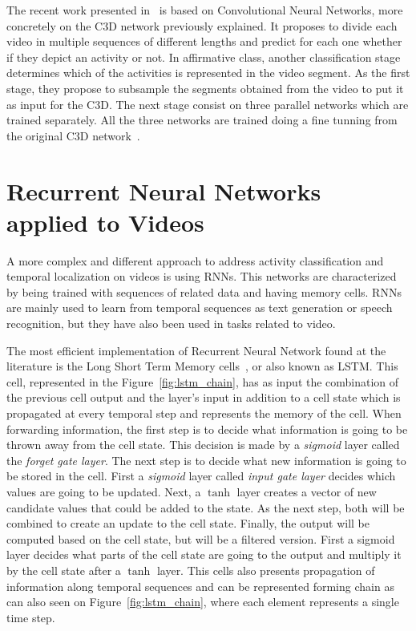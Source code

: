 The recent work presented in~\cite{shoutemporal} is based on Convolutional Neural Networks, more concretely on the C3D network previously explained. It proposes to divide each video in multiple sequences of different lengths and predict for each one whether if they depict an activity or not. In affirmative class, another classification stage determines which of the activities is represented in the video segment. As the first stage, they propose to subsample the segments obtained from the video to put it as input for the C3D. The next stage consist on three parallel networks which are trained separately. All the three networks are trained doing a fine tunning from the original C3D network~\cite{tran2014learning}.

\section{Recurrent Neural Networks applied to Videos}

A more complex and different approach to address activity classification and temporal localization on videos is using RNNs. This networks are characterized by being trained with sequences of related data and having memory cells. RNNs are mainly used to learn from temporal sequences as text generation or speech recognition, but they have also been used in tasks related to video.

The most efficient implementation of Recurrent Neural Network found at the literature is the Long Short Term Memory cells~\cite{hochreiter1997long}, or also known as LSTM. This cell, represented in the Figure~\ref{fig:lstm_chain}, has as input the combination of the previous cell output and the layer's input in addition to a cell state which is propagated at every temporal step and represents the memory of the cell.
When forwarding information, the first step is to decide what information is going to be thrown away from the cell state. This decision is made by a \textit{sigmoid} layer called the \textit{forget gate layer}.
The next step is to decide what new information is going to be stored in the cell. First a \textit{sigmoid} layer called \textit{input gate layer} decides which values are going to be updated. Next, a $\tanh$ layer creates a vector of new candidate values that could be added to the state. As the next step, both will be combined to create an update to the cell state.
Finally, the output will be computed based on the cell state, but will be a filtered version. First a sigmoid layer decides what parts of the cell state are going to the output and multiply it by the cell state after a $\tanh$ layer.
This cells also presents propagation of information along temporal sequences and can be represented forming chain as can also seen on Figure~\ref{fig:lstm_chain}, where each element represents a single time step.

